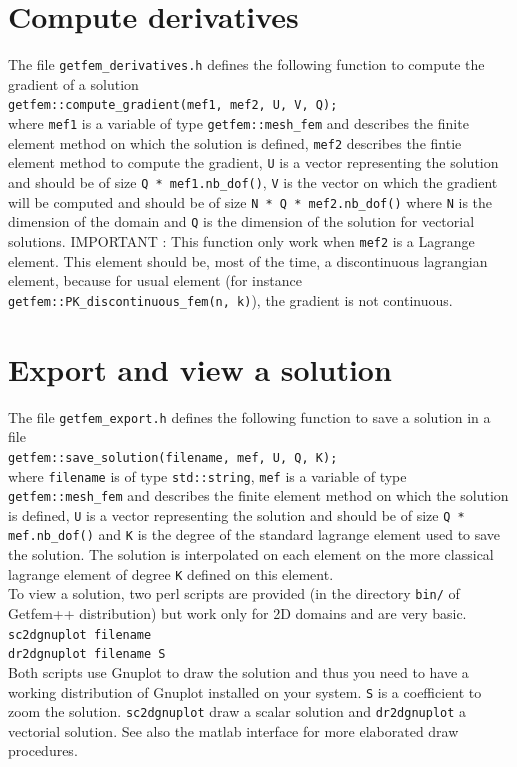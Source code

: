\documentclass[11pt,a4paper]{article}
\begin{document}
\section{Compute derivatives}

The file {\tt getfem\_derivatives.h}  defines the following function to compute the gradient of a solution\\[0.5cm]
{\tt getfem::compute\_gradient(mef1, mef2, U, V, Q); }\\[0.5cm]
where {\tt mef1} is a variable of type {\tt getfem::mesh\_fem} and describes the finite element method on which the solution is defined, {\tt mef2} describes the fintie element method to compute the gradient, {\tt U} is a vector representing the solution and should be of size {\tt Q * mef1.nb\_dof()}, {\tt V} is the vector on which the gradient will be computed and should be of size
{\tt N * Q * mef2.nb\_dof()} where {\tt N} is the dimension of the domain and {\tt Q} is the dimension of the solution for vectorial solutions. IMPORTANT : This function only work when {\tt mef2} is a Lagrange element. This element should be, most of the time, a discontinuous lagrangian element, because for usual element (for instance {\tt getfem::PK\_discontinuous\_fem(n, k)}), the gradient is not continuous.

\section{Export and view a solution}

The file {\tt getfem\_export.h} defines the following function to save a solution in a file\\[0.5cm]
{\tt getfem::save\_solution(filename, mef, U, Q, K); }\\[0.5cm]
where {\tt filename} is of type {\tt std::string}, {\tt mef}  is a variable of type {\tt getfem::mesh\_fem} and describes the finite element method on which the solution is defined, {\tt U} is a vector representing the solution and should be of size {\tt Q * mef.nb\_dof()} and {\tt K} is the degree of the standard lagrange element used to save the solution. The solution is interpolated on each element on the more classical lagrange element of degree {\tt K} defined on this element.\\[0.5cm]
To view a solution, two perl scripts are provided (in the directory {\tt bin/} of {\sc Getfem++} distribution) but work only for 2D domains and are very basic.\\[0.5cm]
{\tt sc2dgnuplot filename}\\[0.5cm]
{\tt dr2dgnuplot filename S}\\[0.5cm]
Both scripts use Gnuplot to draw the solution and thus you need to have a working distribution of Gnuplot installed on your system. {\tt S} is a coefficient to zoom the solution. {\tt sc2dgnuplot} draw a scalar solution and {\tt dr2dgnuplot} a vectorial solution. See also the matlab interface for more elaborated draw procedures.
\end{document}
